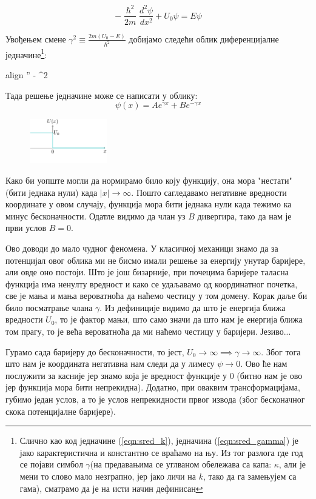 \documentclass{tufte-handout} %
\newcommand{\boxedeq}[1]{\begin{empheq}[box={\fboxsep=6pt\fbox}]{align} #1\end{empheq}}
\theoremstyle{definition}
\theoremstyle{remark}
\newcommand{\hb}{\hslash}
\begin{document}
\begin{equation*}
	-\frac{\hb^2}{2m}\frac{d^2\psi}{dx^2}+U_0\psi=E\psi
\end{equation*}\par
Увођењем смене $\gamma^2\equiv\frac{2m(U_0-E)}{\hb^2}$ добијамо следећи облик диференцијалне једначине\footnote{Слично као код једначине (\ref{eqn:sred_k}), једначина (\ref{eqn:sred_gamma}) је јако карактеристична и константно се враћамо на њу. Из тог разлога где год се појави симбол $\gamma$(на предавањима се углваном обележава са капа: $\kappa$, али је мени то слово мало незграпно, јер јако личи на $k$, тако да га замењујем са гама), сматрамо да је на исти начин дефинисан}:
\boxedeq{\label{eqn:sred_gamma}\psi'' - \gamma^2}
Тада решење једначине може се написати у облику:
\begin{equation}
	\psi(x)=Ae^{\gamma x} + Be^{-\gamma x}
\end{equation}
\begin{figure}
	\centering
	\includegraphics[width=0.3\textwidth]{konacna_barijera.png}
	\caption{}
	\label{fig:konacna_barijera}
\end{figure}\par
Како би уопште могли да нормирамо било коју функцију, она мора "нестати" (бити једнака нули) када $|x|\rightarrow\infty$. Пошто сагледавамо негативне вредности координате у овом случају, функција мора бити једнака нули када тежимо ка минус бесконачности. Одатле видимо да члан уз $B$ дивергира, тако да нам је први услов $B=0$.\par Ово доводи до мало чудног феномена. У класичној механици знамо да за потенцијал овог облика ми не бисмо имали решење за енергију унутар баријере, али овде оно постоји. Што је још бизарније, при почецима баријере таласна функција има ненулту вредност и како се удаљавамо од координатног почетка, све је мања и мања вероватноћа да наћемо честицу у том домену. Корак даље би било посматрање члана $\gamma$. Из дефиниције видимо да што је енергија ближа вредности $U_0$, то је фактор мањи, што само значи да што нам је енергија ближа том прагу, то је већа вероватноћа да ми наћемо честицу у баријери. Језиво...\par
Гурамо сада баријеру до бесконачности, то јест, $U_0\rightarrow\infty\implies\gamma\rightarrow\infty$. Због тога што нам је координата негативна нам следи да у лимесу $\psi\rightarrow0$. Ово ће нам послужити за касније јер знамо која је вредност функције у 0 (битно нам је ово јер функција мора бити непрекидна). Додатно, при оваквим трансформацијама, губимо један услов, а то је услов непрекидности првог извода (због бесконачног скока потенцијалне баријере).\par
\end{document}
